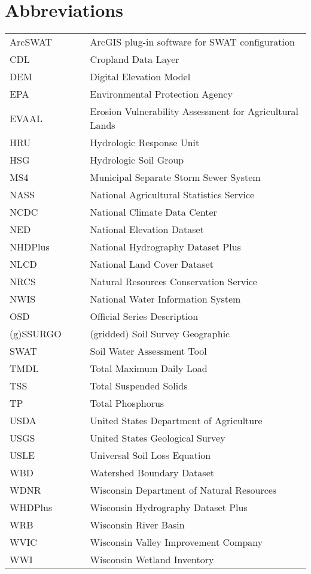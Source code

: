 \section*{Abbreviations}

\begin{tabular}{l c c l}

ArcSWAT &   & & ArcGIS plug-in software for SWAT configuration \\
CDL		&	& &	Cropland Data Layer				\\
DEM		&	& &	Digital Elevation Model			\\
EPA		&	& &	Environmental Protection Agency	\\
EVAAL	&	& & Erosion Vulnerability Assessment for Agricultural Lands \\
HRU 	& 	& &	Hydrologic Response Unit 		\\
HSG		&	& &	Hydrologic Soil Group			\\
MS4		&	& &	Municipal Separate Storm Sewer System \\
NASS	&	& &	National Agricultural Statistics Service \\
NCDC	&	& &	National Climate Data Center \\
NED     &   & & National Elevation Dataset \\
NHDPlus &   & & National Hydrography Dataset Plus \\
NLCD	&	& &	National Land Cover Dataset	\\
NRCS	& 	& &	Natural Resources Conservation Service \\
NWIS	&	& &	National Water Information System \\
OSD		&	& &	Official Series Description \\
(g)SSURGO	& & &	(gridded) Soil Survey Geographic \\
SWAT 	& 	& &	Soil Water Assessment Tool 		\\
TMDL	&	& &	Total Maximum Daily Load		\\
TSS		&	& &	Total Suspended Solids		\\
TP		&	& & Total Phosphorus			\\
USDA	&	& &	United States Department of Agriculture\\
USGS 	&	& &	United States Geological Survey \\
USLE	&	& &	Universal Soil Loss Equation	\\
WBD		&	& &	Watershed Boundary Dataset		\\
WDNR	&	& &	Wisconsin Department of Natural Resources \\
WHDPlus	&	& &	Wisconsin Hydrography Dataset Plus \\
WRB		&	& &	Wisconsin River Basin			\\
WVIC	&	& &	Wisconsin Valley Improvement Company \\
WWI		&	& &	Wisconsin Wetland Inventory		\\
\end{tabular}

\clearpage